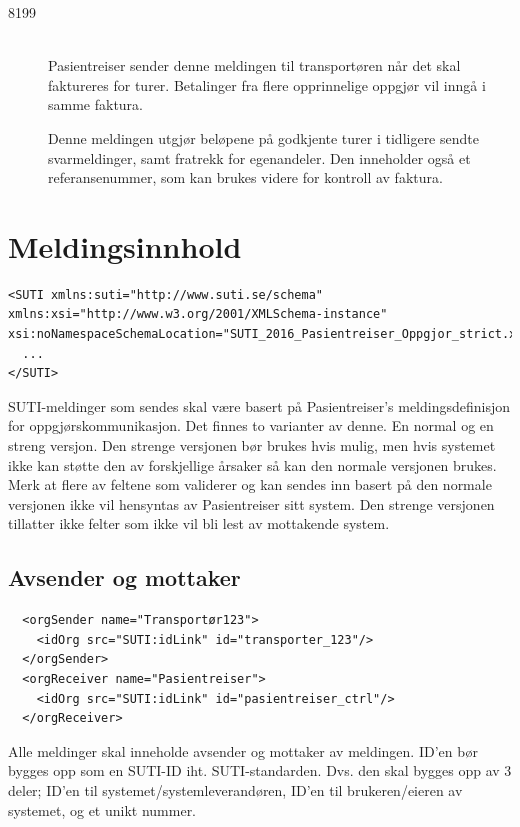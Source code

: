 \documentclass[a4paper,titlepage,norsk,11pt]{article}
\begin{document}
\begin{description}

	\item[8199] \hfill \\
	Pasientreiser sender denne meldingen til transportøren når det skal faktureres for turer. Betalinger fra flere opprinnelige oppgjør vil inngå i samme faktura.

	Denne meldingen utgjør beløpene på godkjente turer i tidligere sendte svarmeldinger, samt fratrekk for egenandeler. Den inneholder også et referansenummer, som kan brukes videre for kontroll av faktura.

\end{description}

\section{Meldingsinnhold}
\label{sec:Meldingsinnhold}

\begin{lstlisting}
<SUTI xmlns:suti="http://www.suti.se/schema" xmlns:xsi="http://www.w3.org/2001/XMLSchema-instance" xsi:noNamespaceSchemaLocation="SUTI_2016_Pasientreiser_Oppgjor_strict.xsd">
  ...
</SUTI>
\end{lstlisting}

SUTI-meldinger som sendes skal være basert på Pasientreiser's meldingsdefinisjon for oppgjørskommunikasjon. Det finnes to varianter av denne. En normal og en streng versjon. Den strenge versjonen bør brukes hvis mulig, men hvis systemet ikke kan støtte den av forskjellige årsaker så kan den normale versjonen brukes. Merk at flere av feltene som validerer og kan sendes inn basert på den normale versjonen ikke vil hensyntas av Pasientreiser sitt system. Den strenge versjonen tillatter ikke felter som ikke vil bli lest av mottakende system.

\subsection{Avsender og mottaker}

\begin{lstlisting}
  <orgSender name="Transportør123">
    <idOrg src="SUTI:idLink" id="transporter_123"/>
  </orgSender>
  <orgReceiver name="Pasientreiser">
    <idOrg src="SUTI:idLink" id="pasientreiser_ctrl"/>
  </orgReceiver>
\end{lstlisting}

Alle meldinger skal inneholde avsender og mottaker av meldingen. ID'en bør bygges opp som en SUTI-ID iht. SUTI-standarden. Dvs. den skal bygges opp av 3 deler; ID'en til systemet/systemleverandøren, ID'en til brukeren/eieren av systemet, og et unikt nummer.
\end{document}
